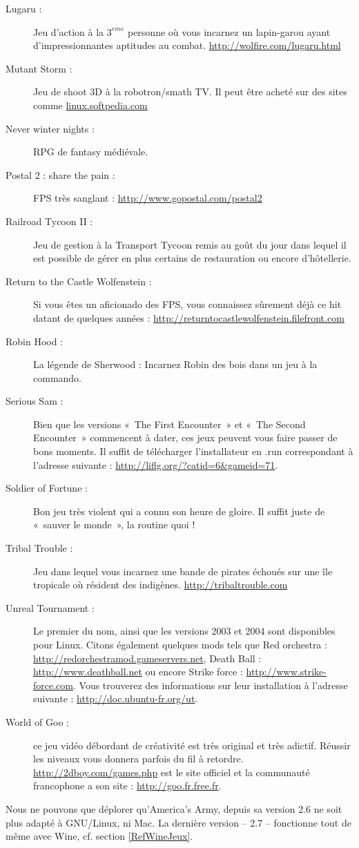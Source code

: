 \begin{description}
\item[Lugaru :] Jeu d'action à la $3^{eme}$ personne où vous incarnez un lapin-garou ayant d'impressionnantes aptitudes au combat. \url{http://wolfire.com/lugaru.html}
\item[Mutant Storm :] Jeu de shoot 3D à la robotron/smath TV. Il peut être acheté sur des sites comme \url{linux.softpedia.com}
\item[Never winter nights :] RPG de fantasy médiévale.
\item[Postal 2 : share the pain :] FPS très sanglant : \url{http://www.gopostal.com/postal2}
\item[Railroad Tycoon II :] Jeu de gestion à la Transport Tycoon remis au goût du jour dans lequel il est possible de gérer en plus certains  de restauration ou encore d'hôtellerie.
\item[Return to the Castle Wolfenstein :] Si vous êtes un aficionado des FPS, vous connaissez sûrement déjà ce hit datant de quelques années : \url{http://returntocastlewolfenstein.filefront.com}
\item[Robin Hood :] La légende de Sherwood : Incarnez Robin des bois dans un jeu à la commando.
\item[Serious Sam :] Bien que les versions «~The First Encounter~» et «~The Second Encounter~» commencent à dater, ces jeux peuvent vous faire passer de bons moments. Il suffit de télécharger l'installateur en .run correspondant à l'adresse suivante : \url{http://liflg.org/?catid=6&gameid=71}.
\item[Soldier of Fortune :] Bon jeu très violent qui a connu son heure de gloire. Il suffit juste de «~sauver le monde~», la routine quoi ! 
\item[Tribal Trouble :] Jeu dans lequel vous incarnez une bande de pirates échoués sur une île tropicale où résident des indigènes. \url{http://tribaltrouble.com}
\item[Unreal Tournament :] Le premier du nom, ainsi que les versions 2003 et 2004 sont disponibles pour Linux. Citons également quelques mods tels que Red orchestra : \url{http://redorchestramod.gameservers.net}, Death Ball : \url{http://www.deathball.net} ou encore Strike force : \url{http://www.strike-force.com}. Vous trouverez des informations sur leur installation à l'adresse suivante : \url{http://doc.ubuntu-fr.org/ut}.
\item[World of Goo :] ce jeu vidéo débordant de créativité est très original et très adictif. Réussir les niveaux vous donnera parfois du fil à retordre. \url{http://2dboy.com/games.php} est le site officiel et la communauté francophone a son site : \url{http://goo.fr.free.fr}.
\end{description}
\begin{nota}
Nous ne pouvons que déplorer qu'America's Army, depuis sa version 2.6 ne soit plus adapté à GNU/Linux, ni Mac. La dernière version -- 2.7 -- fonctionne tout de même avec Wine, cf. section \ref{RefWineJeux}.
\end{nota}
